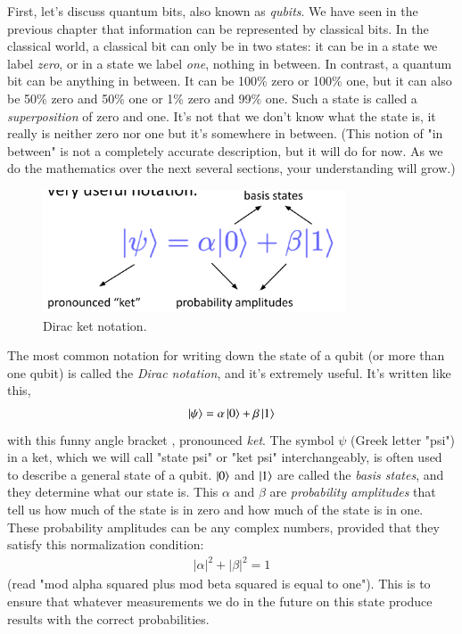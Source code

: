 First, let's discuss quantum bits, also known as \emph{qubits}. We have seen in the previous chapter that information can be represented by classical bits. In the classical world, a classical bit can only be in two states: it can be in a state we label \emph{zero}, or in a state we label \emph{one}, nothing in between. In contrast, a quantum bit can be anything in between. It can be 100\% zero or 100\% one, but it can also be 50\% zero and 50\% one or 1\% zero and 99\% one. Such a state is called a \emph{superposition} of zero and one. It's not that we don't know what the state is, it really is neither zero nor one but it's somewhere in between. (This notion of "in between" is not a completely accurate description, but it will do for now.  As we do the mathematics over the next several sections, your understanding will grow.)

\begin{figure}[H]
    \centering
    \includegraphics[width=0.8\textwidth]{lesson2/dirac_notation.pdf}
    
        \caption{Dirac ket notation. }
    
    \label{fig:ket-notation}
\end{figure}

The most common notation for writing down the state of a qubit (or more than one qubit) is called the \emph{Dirac notation}, and it's extremely useful. It's written like this,
\begin{align}
\left| \psi \right\rangle = \alpha\left| 0 \right\rangle + \beta\left| 1 \right\rangle
\end{align}
with this funny angle bracket \ket{}, pronounced \emph{ket}. The symbol $\psi$ (Greek letter "psi") in a ket, which we will call "state psi" or "ket psi" interchangeably, is often used to describe a general state of a qubit. $\left| 0 \right\rangle$ and $\left| 1 \right\rangle$ are called the \emph{basis states}, and they determine what our state is. This $\alpha$ and $\beta$ are \emph{probability amplitudes} that tell us how much of the state is in zero and how much of the state is in one.  These probability amplitudes can be any complex numbers, provided that they satisfy this normalization condition:
\begin{align}
    |\alpha|^2 + |\beta|^2 = 1
    \label{eq:normalization-condition}
\end{align}
(read "mod alpha squared plus mod beta squared is equal to one"). This is to ensure that whatever measurements we do in the future on this state produce results with the correct probabilities.


